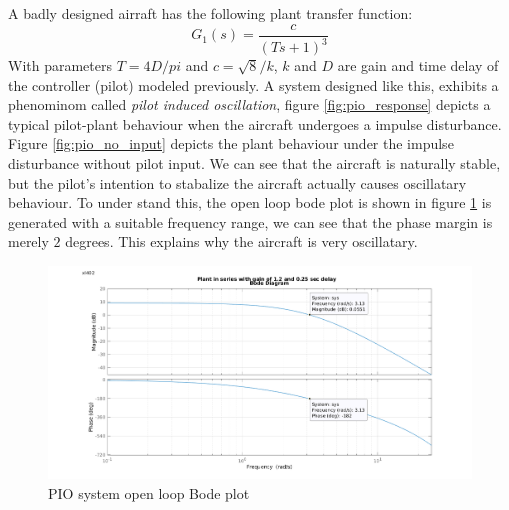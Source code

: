 \documentclass{article}
\begin{document}
A badly designed airraft has the following plant transfer function:
\begin{equation}
	G_1(s)=\dfrac{c}{(Ts+1)^3}
\end{equation}
With parameters $T=4D/pi$ and $c=\sqrt{8}/k$, $k$ and $D$ are gain and time delay of the controller (pilot) modeled previously. A system designed like this, exhibits a phenominom called \textit{pilot induced oscillation}, figure \ref{fig:pio_response} depicts a typical pilot-plant behaviour when the aircraft undergoes a impulse disturbance. Figure \ref{fig:pio_no_input} depicts the plant behaviour under the impulse disturbance without pilot input. We can see that the aircraft is naturally stable, but the pilot's intention to stabalize the aircraft actually causes oscillatary behaviour. To under stand this, the open loop bode plot is shown in figure \ref{fig:pio_bode} is generated with a suitable frequency range, we can see that the phase margin is merely $2$ degrees. This explains why the aircraft is very oscillatary.


\begin{figure}[htp]
	\centering
	\includegraphics[width=0.9\linewidth]{2_PIO_Bode_Plot.png}
	\caption{PIO system open loop Bode plot}
	\label{fig:pio_bode}
\end{figure}
\end{document}
